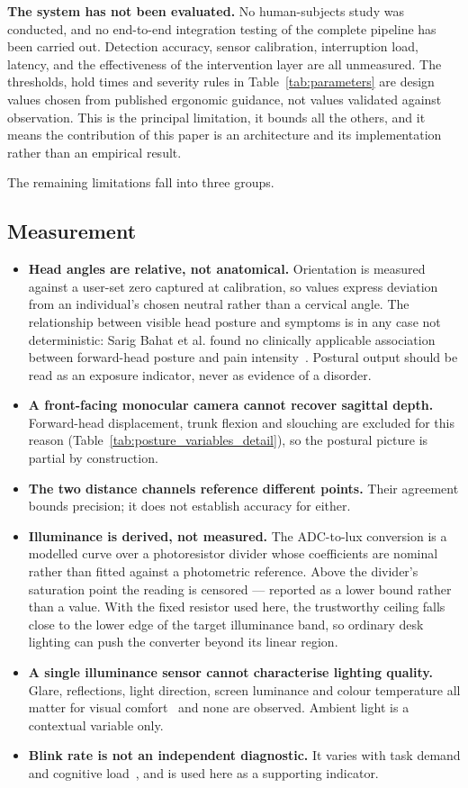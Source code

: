 \textbf{The system has not been evaluated.} No human-subjects study was conducted, and no
end-to-end integration testing of the complete pipeline has been carried out. Detection accuracy,
sensor calibration, interruption load, latency, and the effectiveness of the intervention layer are
all unmeasured. The thresholds, hold times and severity rules in Table~\ref{tab:parameters} are
design values chosen from published ergonomic guidance, not values validated against observation.
This is the principal limitation, it bounds all the others, and it means the contribution of this
paper is an architecture and its implementation rather than an empirical result.

The remaining limitations fall into three groups.

\subsection{Measurement}

\begin{itemize}
    \item \textbf{Head angles are relative, not anatomical.} Orientation is measured against a
    user-set zero captured at calibration, so values express deviation from an individual's chosen
    neutral rather than a cervical angle. The relationship between visible head posture and symptoms
    is in any case not deterministic: Sarig Bahat et al. found no clinically applicable association
    between forward-head posture and pain intensity~\cite{ref22}. Postural output should be read as
    an exposure indicator, never as evidence of a disorder.
    \item \textbf{A front-facing monocular camera cannot recover sagittal depth.} Forward-head
    displacement, trunk flexion and slouching are excluded for this reason
    (Table~\ref{tab:posture_variables_detail}), so the postural picture is partial by construction.
    \item \textbf{The two distance channels reference different points.} Their agreement bounds
    precision; it does not establish accuracy for either.
    \item \textbf{Illuminance is derived, not measured.} The ADC-to-lux conversion is a modelled
    curve over a photoresistor divider whose coefficients are nominal rather than fitted against a
    photometric reference. Above the divider's saturation point the reading is censored --- reported
    as a lower bound rather than a value. With the fixed resistor used here, the trustworthy ceiling
    falls close to the lower edge of the target illuminance band, so ordinary desk lighting can push
    the converter beyond its linear region.
    \item \textbf{A single illuminance sensor cannot characterise lighting quality.} Glare,
    reflections, light direction, screen luminance and colour temperature all matter for visual
    comfort~\cite{ref7} and none are observed. Ambient light is a contextual variable only.
    \item \textbf{Blink rate is not an independent diagnostic.} It varies with task demand and
    cognitive load~\cite{ref11}, and is used here as a supporting indicator.
\end{itemize}

